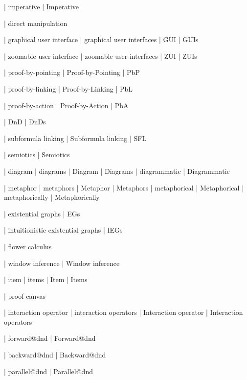  | imperative
 | Imperative

 | direct manipulation

 | graphical user interface
 | graphical user interfaces
 | GUI
 | GUIs

 | zoomable user interface
 | zoomable user interfaces
 | ZUI
 | ZUIs

 | proof-by-pointing
 | Proof-by-Pointing
 | PbP

 | proof-by-linking
 | Proof-by-Linking
 | PbL

 | proof-by-action
 | Proof-by-Action
 | PbA

 | DnD
 | DnDs

 | subformula linking
 | Subformula linking
 | SFL

 | semiotics
 | Semiotics

 | diagram
 | diagrams
 | Diagram
 | Diagrams
 | diagrammatic
 | Diagrammatic

 | metaphor
 | metaphors
 | Metaphor
 | Metaphors
 | metaphorical
 | Metaphorical
 | metaphorically
 | Metaphorically

 | existential graphs
 | EGs

 | intuitionistic existential graphs
 | IEGs

 | flower calculus
 
 | window inference
 | Window inference


 | item
 | items
 | Item
 | Items

 | proof canvas

 | interaction operator
 | interaction operators
 | Interaction operator
 | Interaction operators

 | forward@dnd
 | Forward@dnd

 | backward@dnd
 | Backward@dnd

 | parallel@dnd
 | Parallel@dnd


